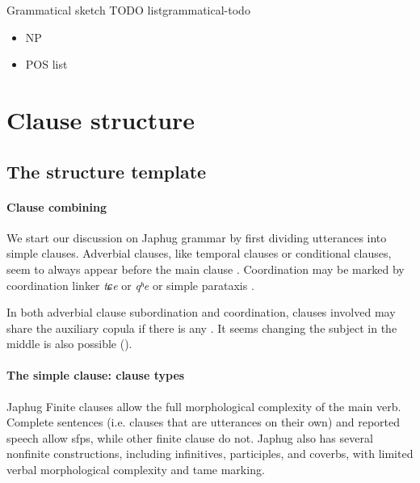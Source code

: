 \documentclass[a4paper, oneside, 12pt]{report}
\newcommand*{\citesec}[1]{\S~{#1}}
\newcommand*{\citechap}[1]{Ch~{#1}}
\newcommand*{\citepage}[1]{p.~{#1}}
\newcommand{\form}[1]{\emph{#1}}
\begin{document}
\begin{todobox}{Grammatical sketch TODO list}{grammatical-todo}
    \begin{itemize}
        \item NP
        \item POS list
    \end{itemize}
\end{todobox}

\section{Clause structure}\label{sec:grammatical.clause}

\subsection{The structure template}\label{sec:grammatical.clause.template}

\paragraph*{Clause combining}
We start our discussion on Japhug grammar 
by first dividing utterances into simple clauses.
Adverbial clauses, like temporal clauses or conditional clauses,
seem to always appear before the main clause \citep[\citechap{25}]{jacques2021grammar}.
Coordination may be marked by coordination linker \form{tɕe} or \form{qʰe} or simple parataxis
\citep[\citesec{25.1.6}]{jacques2021grammar}.

In both adverbial clause subordination and coordination,
clauses involved may share the auxiliary copula if there is any
\citep[\citepage{47}, (40); \citepage{1091}, (10)]{jacques2021grammar}.
It seems changing the subject in the middle is also possible
().

\paragraph*{The simple clause: clause types}
Japhug Finite clauses allow the full morphological complexity of the main verb.
Complete sentences (i.e. clauses that are utterances on their own)
and reported speech \citep[\citesec{24.2.5.1}]{jacques2021grammar} allow \acp{sfp},
while other finite clause do not.
Japhug also has several nonfinite constructions,
including infinitives, participles, and coverbs,
with limited verbal morphological complexity and \ac{tame} marking.  
\end{document}
